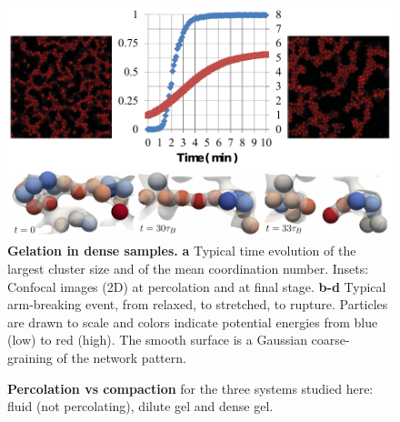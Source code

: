 \clearpage
\begin{figure}
	\begin{center}
	\includegraphics{generate-figure2.pdf}
	\end{center}
	\caption{\textbf{Gelation in dense samples.} \textbf{a} Typical time evolution of the largest cluster size and of the mean coordination number. Insets: Confocal images (2D) at percolation and at final stage. \textbf{b-d} Typical arm-breaking event, from relaxed, to stretched, to rupture. Particles are drawn to scale and colors indicate potential energies from blue (low) to red (high). The smooth surface is a Gaussian coarse-graining of the network pattern. %
	}
	\label{fig:dense}
\end{figure}

\clearpage
\begin{figure}
	\begin{center}
	\end{center}
	\caption{\textbf{Percolation vs compaction} for the three systems studied here: fluid (not percolating), dilute gel and dense gel.}
	\label{fig:general}
\end{figure}
